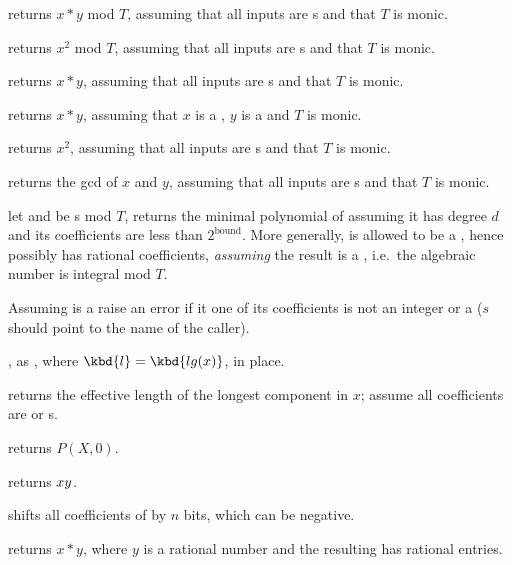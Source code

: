  returns $x*y$ mod $T$, assuming
that all inputs are s and that $T$ is monic.

 returns $x^2$ mod $T$, assuming
that all inputs are s and that $T$ is monic.


 returns $x*y$, assuming
that all inputs are s and that $T$ is monic.

 returns $x*y$, assuming
that $x$ is a , $y$ is a  and $T$ is monic.

 returns $x^2$, assuming
that all inputs are s and that $T$ is monic.

 returns the gcd of $x$ and $y$,
assuming that all inputs are s and that $T$ is monic.

let  and  be s mod $T$, returns the minimal polynomial
of  assuming it has degree $d$ and its coefficients are less
than $2^{\text{bound}}$.  More generally,  is allowed to be a ,
hence possibly has rational coefficients, \emph{assuming} the result is a
, i.e.~the algebraic number  is integral mod $T$.


 Assuming  is a 
raise an error if it one of its coefficients is not an integer or a 
($s$ should point to the name of the caller).

, as , where
$\kbd{l} = \kbd{lg(x)}$, in place.

 returns the effective length of the longest
component in $x$; assume all coefficients are  or s.

 returns $P(X, 0)$.

 returns $x\*y$.

 shifts all coefficients of  by $n$
bits, which can be negative.

 returns $x*y$, where $y$ is a rational number
and the resulting  has rational entries.

